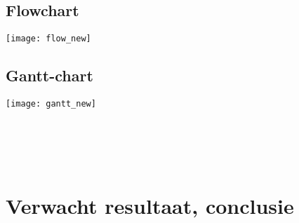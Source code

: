 
\subsection{Flowchart}
\texttt{[image: flow\_new]}
\\

\subsection{Gantt-chart}
\texttt{[image: gantt\_new]}
\\\\\\\\\\

\section{Verwacht resultaat, conclusie}%
\label{sec:verwachte_resultaten}







